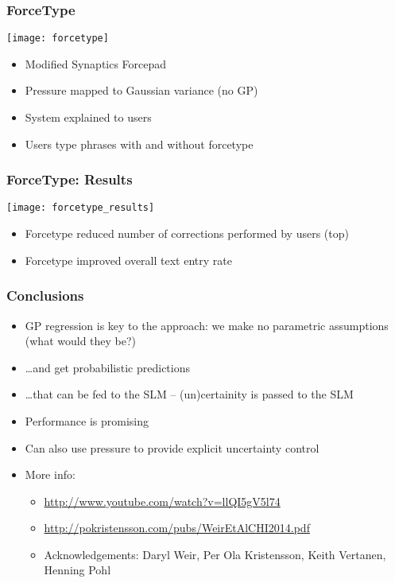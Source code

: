 \begin{frame}
	\frametitle{ForceType}
	\centering\texttt{[image: forcetype]}
	\begin{itemize}
		\item Modified Synaptics Forcepad
		\item Pressure mapped to Gaussian variance (no \ac{GP})
		\item System explained to users
		\item Users type phrases with and without forcetype
	\end{itemize}
\end{frame}

\begin{frame}
	\frametitle{ForceType: Results}
	\begin{multicols}{2}
		\texttt{[image: forcetype\_results]}
		\newpage
		\vfill
		\begin{itemize}
			\item Forcetype reduced number of corrections performed by users (top)
			\item Forcetype improved overall text entry rate
		\end{itemize}
		\vfill
	\end{multicols}
\end{frame}

\begin{frame}
	\frametitle{Conclusions}
		\begin{itemize}
			\item GP regression is key to the approach: we make no parametric assumptions (what would they be?)
			\item \ldots and get probabilistic predictions
			\item \ldots that can be fed to the \ac{SLM} -- (un)certainity is passed to the \ac{SLM}
			\item Performance is promising
			\item<2->Can also use pressure to provide explicit uncertainty control
			\item<3->More info:
			\begin{itemize}
				\item \url{http://www.youtube.com/watch?v=llQI5gV5l74}
				\item \url{http://pokristensson.com/pubs/WeirEtAlCHI2014.pdf}
				\item Acknowledgements: Daryl Weir, Per Ola Kristensson, Keith Vertanen, Henning Pohl
			\end{itemize}
		\end{itemize}
\end{frame}

